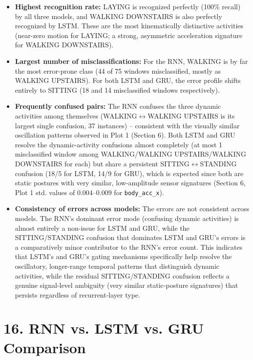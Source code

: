 \documentclass[10pt]{article}
\begin{document}
\begin{itemize}
\item \textbf{Highest recognition rate:} LAYING is recognized perfectly
(100\% recall) by all three models, and WALKING DOWNSTAIRS is also
perfectly recognized by LSTM. These are the most kinematically distinctive
activities (near-zero motion for LAYING; a strong, asymmetric acceleration
signature for WALKING DOWNSTAIRS).
\item \textbf{Largest number of misclassifications:} For the RNN, WALKING
is by far the most error-prone class (44 of 75 windows misclassified,
mostly as WALKING UPSTAIRS). For both LSTM and GRU, the error profile shifts
entirely to SITTING (18 and 14 misclassified windows respectively).
\item \textbf{Frequently confused pairs:} The RNN confuses the three
dynamic activities among themselves (WALKING$\leftrightarrow$WALKING
UPSTAIRS is its largest single confusion, 37 instances) -- consistent with
the visually similar oscillation patterns observed in Plot 1 (Section 6).
Both LSTM and GRU resolve the dynamic-activity confusions almost completely
(at most 1 misclassified window among WALKING/WALKING UPSTAIRS/WALKING
DOWNSTAIRS for each) but share a persistent
SITTING$\leftrightarrow$STANDING confusion (18/5 for LSTM, 14/9 for GRU),
which is expected since both are static postures with very similar,
low-amplitude sensor signatures (Section 6, Plot 1 std. values of
0.004--0.009 for \texttt{body\_acc\_x}).
\item \textbf{Consistency of errors across models:} The errors are not
consistent across models. The RNN's dominant error mode (confusing dynamic
activities) is almost entirely a non-issue for LSTM and GRU, while the
SITTING/STANDING confusion that dominates LSTM and GRU's errors is a
comparatively minor contributor to the RNN's error count. This indicates
that LSTM's and GRU's gating mechanisms specifically help resolve the
oscillatory, longer-range temporal patterns that distinguish dynamic
activities, while the residual SITTING/STANDING confusion reflects a
genuine signal-level ambiguity (very similar static-posture signatures)
that persists regardless of recurrent-layer type.
\end{itemize}

\section*{16. RNN vs. LSTM vs. GRU Comparison}
\end{document}
